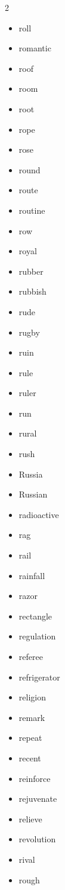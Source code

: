 \documentclass[../../book.tex]{subfiles}
\begin{document}
\begin{multicols}{2}
\begin{itemize}
\item[-] roll
\item[-] romantic
\item[-] roof
\item[-] room
\item[-] root
\item[-] rope
\item[-] rose
\item[-] round
\item[-] route
\item[-] routine
\item[-] row
\item[-] royal
\item[-] rubber
\item[-] rubbish
\item[-] rude
\item[-] rugby
\item[-] ruin
\item[-] rule
\item[-] ruler
\item[-] run
\item[-] rural
\item[-] rush
\item[-] Russia
\item[-] Russian
\item[-] radioactive
\item[-] rag
\item[-] rail
\item[-] rainfall
\item[-] razor
\item[-] rectangle
\item[-] regulation
\item[-] referee
\item[-] refrigerator
\item[-] religion
\item[-] remark
\item[-] repeat
\item[-] recent
\item[-] reinforce
\item[-] rejuvenate
\item[-] relieve
\item[-] revolution
\item[-] rival
\item[-] rough
\end{itemize}
\end{multicols}
\end{document}
